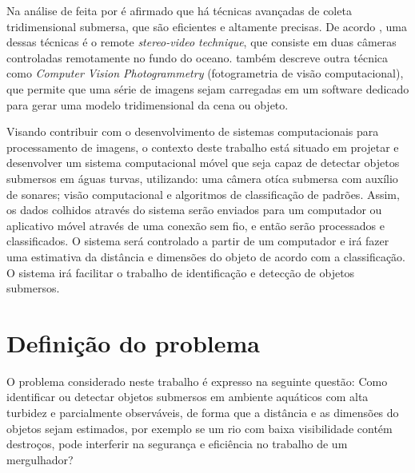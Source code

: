 Na análise de feita por  é afirmado que há técnicas avançadas de coleta tridimensional submersa, que são eficientes e altamente precisas. De acordo , uma dessas técnicas é o remote \textit{stereo-video technique}, que consiste em duas câmeras controladas remotamente no fundo do oceano. \cite{vandamme:2015} também descreve outra técnica como \textit{Computer Vision Photogrammetry} (fotogrametria de visão computacional), que permite que uma série de imagens sejam carregadas em um software dedicado para gerar uma modelo tridimensional da cena ou objeto.


Visando contribuir com o desenvolvimento de sistemas computacionais para processamento de imagens, o contexto deste trabalho está situado em projetar e desenvolver um sistema computacional móvel que seja capaz de detectar objetos submersos em águas turvas, utilizando: uma câmera otíca submersa com auxílio de sonares; visão computacional e algoritmos de classificação de padrões. Assim, os dados colhidos através do sistema serão enviados para um computador ou aplicativo móvel através de uma conexão sem fio, e então serão processados e classificados. O sistema será controlado a partir de um computador e irá fazer uma estimativa da distância e dimensões do objeto de acordo com a classificação. O sistema irá facilitar o trabalho de identificação e detecção de objetos submersos.


\section{Definição do problema} 






O problema considerado neste trabalho é expresso na seguinte questão: Como identificar ou detectar objetos submersos em ambiente aquáticos com alta turbidez e parcialmente observáveis, de forma que a distância e as dimensões do objetos sejam estimados, por exemplo se um rio com baixa visibilidade contém destroços, pode interferir na segurança e eficiência no trabalho de um mergulhador?

